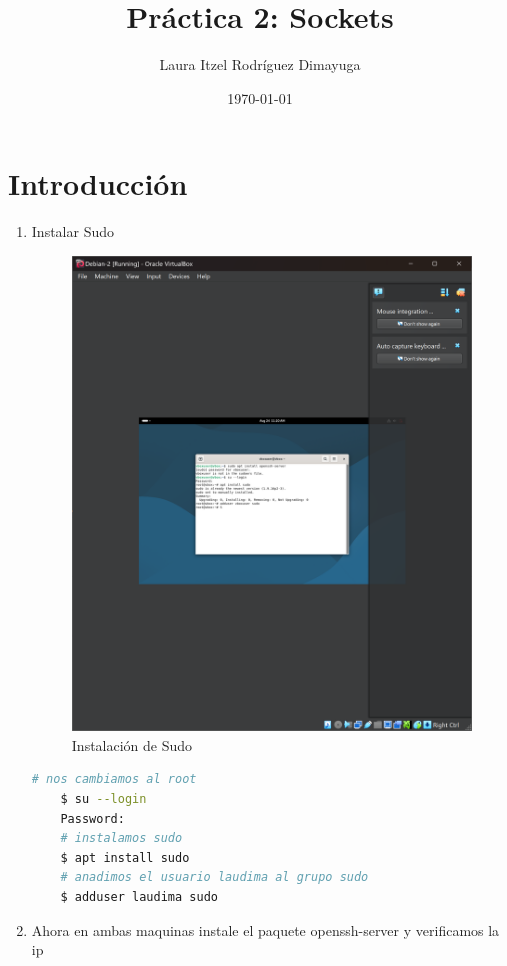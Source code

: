 \documentclass{article}
\title{Práctica 2: Sockets}
\author{Laura Itzel Rodríguez Dimayuga}
\date{\today}
\begin{document}
\maketitle

\section{Introducción}

\begin{enumerate}
    \item Instalar Sudo
    \begin{figure}
        \includegraphics[width=\linewidth]{./images/install_sudo.png}
        \caption{Instalación de Sudo}
    \end{figure}
    \begin{lstlisting}[language=bash]
    # nos cambiamos al root 
    $ su --login 
    Password: 
    # instalamos sudo 
    $ apt install sudo 
    # anadimos el usuario laudima al grupo sudo
    $ adduser laudima sudo
    \end{lstlisting}
    \item  Ahora en ambas maquinas instale el paquete openssh-server y verificamos la ip

\end{enumerate}
\end{document}

